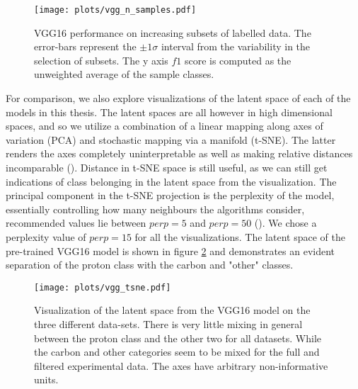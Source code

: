 \begin{figure}
\centering
\texttt{[image: plots/vgg\_n\_samples.pdf]}
\caption[VGG16 performance on labelled subsets]{VGG16 performance on increasing subsets of labelled data. The error-bars represent the $\pm 1\sigma$ interval from the variability in the selection of subsets. The y axis $f1$ score is computed as the unweighted average of the sample classes. }\label{fig:vgg_n_samples}
\end{figure}

For comparison, we also explore visualizations of the latent space of each of the models in this thesis. The latent spaces are all however in high dimensional spaces, and so we utilize a combination of a linear mapping along axes of variation (PCA) and stochastic mapping via a manifold (t-SNE). The latter renders the axes completely uninterpretable as well as making relative distances incomparable (\cite{VanDerMaaten2008}). Distance in t-SNE space is still useful, as we can still get indications of class belonging in the latent space from the visualization. The principal component in the t-SNE projection is the perplexity of the model, essentially controlling how many neighbours the algorithms consider, recommended values lie between $perp=5$ and $perp=50$ (\cite{VanDerMaaten2008}). We chose a perplexity value of $perp=15$ for all the visualizations. The latent space of the pre-trained VGG16 model is shown in figure \ref{fig:vgg_tsne} and demonstrates an evident separation of the proton class with the carbon and "other" classes. 

\begin{figure}
\centering
\texttt{[image: plots/vgg\_tsne.pdf]}
\caption[VGG16 latent visualization]{Visualization of the latent space from the VGG16 model on the three different data-sets. There is very little mixing in general between the proton class and the other two for all datasets. While the carbon and other categories seem to be mixed for the full and filtered experimental data. The axes have arbitrary non-informative units.}\label{fig:vgg_tsne}
\end{figure}